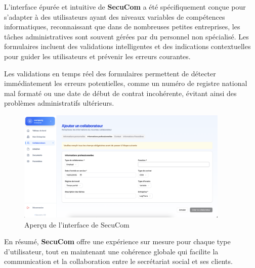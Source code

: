 \vspace{0.5cm}

\noindent L'interface épurée et intuitive de \textbf{SecuCom} a été spécifiquement conçue pour s'adapter à des utilisateurs ayant des niveaux variables de compétences informatiques, reconnaissant que dans de nombreuses petites entreprises, les tâches administratives sont souvent gérées par du personnel non spécialisé. Les formulaires incluent des validations intelligentes et des indications contextuelles pour guider les utilisateurs et prévenir les erreurs courantes.

\begin{note}
Les validations en temps réel des formulaires permettent de détecter immédiatement les erreurs potentielles, comme un numéro de registre national mal formaté ou une date de début de contrat incohérente, évitant ainsi des problèmes administratifs ultérieurs.
\end{note}

\vspace{0.5cm}

\begin{figure}[H]
  \centering
  \includegraphics[width=0.9\textwidth]{SecuComPreviewCollaborator.png}
  \caption{Aperçu de l'interface de SecuCom}
  \label{fig:secucomPreview}
\end{figure}

\vspace{0.5cm}

\noindent En résumé, \textbf{SecuCom} offre une expérience sur mesure pour chaque type d'utilisateur, tout en maintenant une cohérence globale qui facilite la communication et la collaboration entre le secrétariat social et ses clients.
